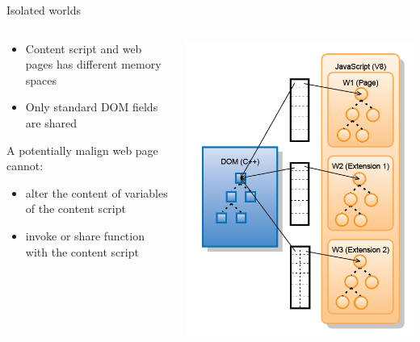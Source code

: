 \documentclass[11pt]{beamer}
\begin{document}
\begin{frame}{Isolated worlds}
\begin{columns}[T]
\begin{column}{.62\textwidth}
\begin{itemize}
\item Content script and web pages has different memory spaces
\item Only standard DOM fields are shared
\end{itemize}
A potentially malign web page cannot:
\begin{itemize}
\item alter the content of variables of the content script
\item invoke or share function with the content script
\end{itemize}
\end{column}%
\begin{column}{.33\textwidth}
\includegraphics[scale=0.28]{Images/IsolatedWorlds.png}
\end{column}%
\end{columns}
\end{frame}
\end{document}
